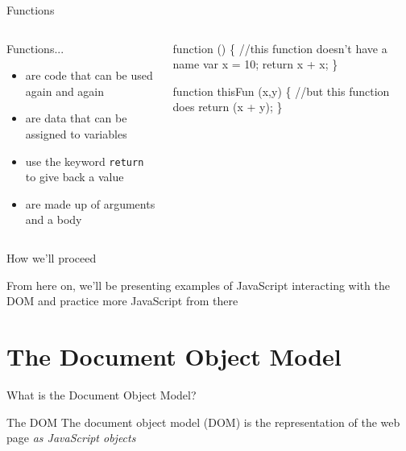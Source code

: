 \documentclass{beamer}
\begin{document}
\begin{frame}[fragile]{Functions}
  \begin{columns}[T]
    \begin{column}{0.35\columnwidth}
      \begin{block}{Functions...}
        \begin{itemize}
          \item<1,2> are code that can be used again and again
          \item<1,3> are data that can be assigned to variables
          \item<1,4> use the keyword \texttt{return} to give back a value
          \item<1,5> are made up of \alert{arguments} and a \alert{body}
        \end{itemize}
      \end{block}
    \end{column}
    \begin{column}{0.6\columnwidth}
      \begin{block}{}
      \begin{semiverbatim}
function () \{ 
//this function doesn't have a name
   var x = 10;
   return x + x;
\}

function thisFun (x,y) \{ 
//but this function does
   return (x + y);
\}
      \end{semiverbatim}
      \end{block}
    \end{column}
  \end{columns}
\end{frame}

\begin{frame}{How we'll proceed}
  \begin{block}{}
    From here on, we'll be presenting examples of JavaScript interacting with the DOM \pause and practice more JavaScript from there
  \end{block}
\end{frame}

\section{The Document Object Model}

\begin{frame}{What is the Document Object Model?}
  \begin{block}{The DOM}
    The document object model (DOM) is the representation of the web page \emph{as JavaScript objects}
  \end{block}
\end{frame}
\end{document}
